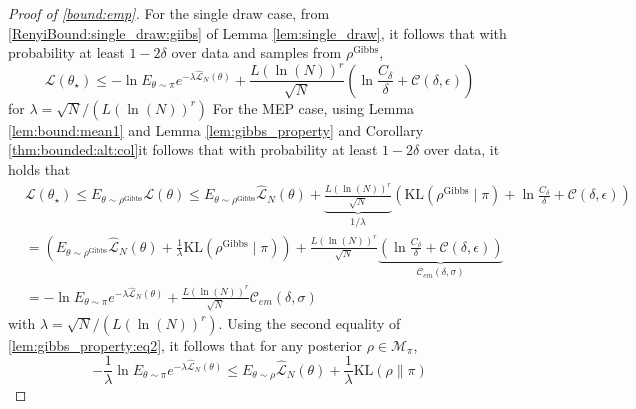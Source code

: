 \documentclass{article}
\newcommand{\KL}{\mathrm{KL}}
\renewcommand{\KL}{\mathrm{KL}}
\begin{document}
\begin{proof}[Proof of \eqref{bound:emp}]
    For the single draw case, from \eqref{RenyiBound:single_draw:giibs} of  Lemma \ref{lem:single_draw}, it follows
    that with probability at least $1-2\delta$ over data and samples from $\rho^{\text{Gibbs}}$,
    \begin{equation}
    \label{bound:emp:single_draw:pf:eq1}
        \mathcal{L}(\theta_{\star}) \le -\ln E_{\theta \sim \pi} e^{-\lambda \hat{\mathcal{L}}_N(\theta)} +
          \frac{L(\ln(N))^{r}}{\sqrt{N}}\left(\ln\frac{C_{\delta}}{\delta} +  \mathcal{C}(\delta,\epsilon)\right)
    \end{equation}
    for $\lambda=\sqrt{N}/(L(\ln(N))^{r})$
     For the MEP case,  using Lemma \ref{lem:bound:mean1} and Lemma \ref{lem:gibbs_property} and Corollary \ref{thm:bounded:alt:col}it follows that with probability at least $1-2\delta$ over data, 
     it holds that
     \begin{equation}
    \label{bound:emp:single_draw:pf:eq2}
    \begin{aligned}
        & \mathcal{L}(\theta_{\star}) \le E_{\theta \sim \rho^{\text{Gibbs}}} \mathcal{L}(\theta) \le E_{\theta \sim \rho^{\text{Gibbs}}} \hat{\mathcal{L}}_N(\theta)  + 
          \underbrace{\frac{L(\ln(N))^{r}}{\sqrt{N}}}_{1/\lambda}
          \left(\KL(\rho^{\text{Gibbs}} \mid \pi)+\ln\frac{C_{\delta}}{\delta} +  \mathcal{C}(\delta,\epsilon)\right) \\
       & = \left( E_{\theta \sim \rho^{\text{Gibbs}}} \hat{\mathcal{L}}_N(\theta)  + \frac{1}{\lambda} \KL(\rho^{\text{Gibbs}} \mid \pi)\right) + \frac{L(\ln(N))^{r}}{\sqrt{N}}\underbrace{\left(\ln\frac{C_{\delta}}{\delta} +  \mathcal{C}(\delta,\epsilon)\right)}_{\mathcal{C}_{em}(\delta,\sigma)} \\
       &  = -\ln E_{\theta \sim \pi} e^{-\lambda \hat{\mathcal{L}}_N(\theta)} +
         \frac{L(\ln(N))^{r}}{\sqrt{N}}\mathcal{C}_{em}(\delta,\sigma)
    \end{aligned}      
    \end{equation}
    with $\lambda=\sqrt{N}/(L(\ln(N))^{r})$.
    Using the second equality of \eqref{lem:gibbs_property:eq2}, it follows that
    for any posterior $\rho \in \mathcal{M}_{\pi}$,
    \begin{equation}
    \label{bound:emp:single_draw:pf:eq3}
          -\frac{1}{\lambda}\ln E_{\theta \sim \pi} e^{-\lambda \hat{\mathcal{L}}_N(\theta)} \le
            E_{\theta \sim \rho} \hat{\mathcal{L}}_N(\theta) + \frac{1}{\lambda}\KL(\rho \| \pi)

\end{equation}
\end{proof}
\end{document}
